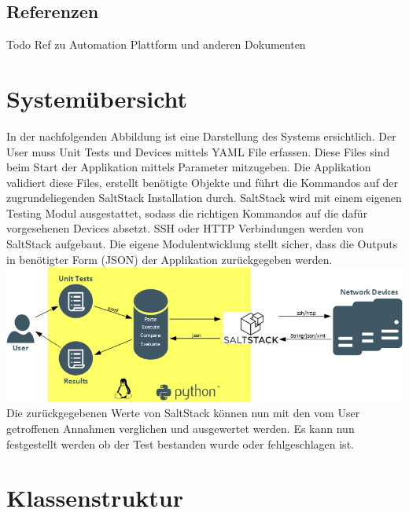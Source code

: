 \documentclass[a4,12pt]{scrartcl}
\begin{document}
\subsection{Referenzen}
\begin{description}
Todo Ref zu Automation Plattform und anderen Dokumenten
\end{description}
\newpage
\section{Systemübersicht}
In der nachfolgenden Abbildung ist eine Darstellung des Systems ersichtlich. Der User muss Unit Tests und Devices mittels YAML File erfassen. Diese Files sind beim Start der Applikation mittels Parameter mitzugeben. Die Applikation validiert diese Files, erstellt benötigte Objekte und führt die Kommandos auf der zugrundeliegenden SaltStack Installation durch. SaltStack wird mit einem eigenen Testing Modul ausgestattet, sodass die richtigen Kommandos auf die dafür vorgesehenen Devices absetzt. SSH oder HTTP Verbindungen werden von SaltStack aufgebaut. Die eigene Modulentwicklung stellt sicher, dass die Outputs in benötigter Form (JSON) der Applikation zurückgegeben werden. \\

\noindent \includegraphics[width=1.00\textwidth]{./pictures/systemuebersicht.png} \\

\noindent Die zurückgegebenen Werte von SaltStack können nun mit den vom User getroffenen Annahmen verglichen und ausgewertet werden. Es kann nun festgestellt werden ob der Test bestanden wurde oder fehlgeschlagen ist. 
\newpage
\section{Klassenstruktur}
\end{document}
